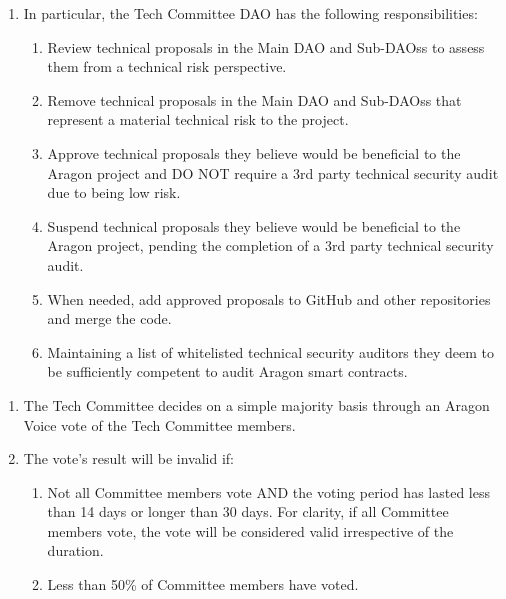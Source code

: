 \begin{enumerate}
	\begin{enumerate}
		
		\begin{enumerate}
			
			\item In particular, the Tech Committee \ac{DAO} has the following responsibilities:
			\begin{enumerate}		
				\item Review technical proposals in the Main \ac{DAO} and Sub-\acp{DAO}s to assess them from a technical risk perspective.
				\item Remove technical proposals in the Main \ac{DAO} and Sub-\acp{DAO}s that represent a material technical risk to the project.
				\item Approve technical proposals they believe would be beneficial to the Aragon project and DO NOT require a 3rd party technical security audit due to being low risk.
				\item Suspend technical proposals they believe would be beneficial to the Aragon project, pending the completion of a 3rd party technical security audit.
				\item When needed, add approved proposals to GitHub and other repositories and merge the code.
				\item Maintaining a list of whitelisted technical security auditors they deem to be sufficiently competent to audit Aragon smart contracts.
			\end{enumerate}
		
		\end{enumerate}
	
		\begin{enumerate}
			\item The Tech Committee decides on a simple majority basis through an Aragon Voice vote of the Tech Committee members.
			\item The vote’s result will be invalid if:
			\begin{enumerate}
				\item Not all Committee members vote AND the voting period has lasted
				less than 14 days or longer than 30 days.
				For clarity, if all Committee members vote, the vote will be considered valid irrespective of the duration.
				\item Less than 50\% of Committee members have voted.
			\end{enumerate}
		\end{enumerate}
	

\end{enumerate}
\end{enumerate}

